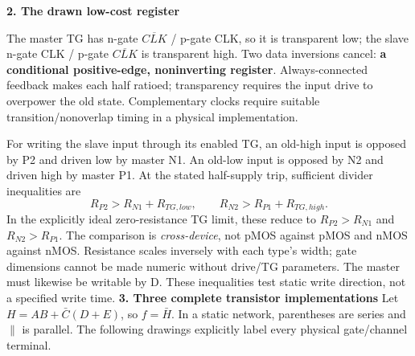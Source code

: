 \documentclass[10pt]{article}
\begin{document}
\textbf{2. The drawn low-cost register}
\begin{center}\end{center}
The master TG has n-gate $\overline{CLK}$ / p-gate CLK, so it is transparent low; the slave n-gate CLK / p-gate $\overline{CLK}$ is transparent high. Two data inversions cancel: \textbf{a conditional positive-edge, noninverting register}. Always-connected feedback makes each half ratioed; transparency requires the input drive to overpower the old state. Complementary clocks require suitable transition/nonoverlap timing in a physical implementation.

For writing the slave input through its enabled TG, an old-high input is opposed by P2 and driven low by master N1. An old-low input is opposed by N2 and driven high by master P1. At the stated half-supply trip, sufficient divider inequalities are
\[\boxed{R_{P2}>R_{N1}+R_{TG,low},\qquad R_{N2}>R_{P1}+R_{TG,high}.}\]
In the explicitly ideal zero-resistance TG limit, these reduce to $R_{P2}>R_{N1}$ and $R_{N2}>R_{P1}$. The comparison is \emph{cross-device}, not pMOS against pMOS and nMOS against nMOS. Resistance scales inversely with each type's width; gate dimensions cannot be made numeric without drive/TG parameters. The master must likewise be writable by D. These inequalities test static write direction, not a specified write time.
\newpage
\textbf{3. Three complete transistor implementations}
Let $H=AB+\bar C(D+E)$, so $f=\bar H$. In a static network, parentheses are series and $\parallel$ is parallel. The following drawings explicitly label every physical gate/channel terminal.
\end{document}
